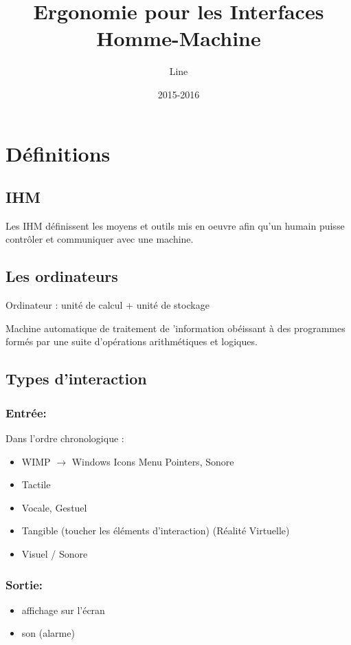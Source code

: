 \documentclass{article}
\title{\textbf{Ergonomie pour les Interfaces Homme-Machine}}
\author{Line \bsc{POUVARET}}
\date{2015-2016}
\begin{document}
\maketitle

\section{Définitions}
\subsection{IHM}
Les IHM définissent les moyens et outils mis en oeuvre afin qu'un humain puisse contrôler et communiquer avec une machine.\\

\subsection{Les ordinateurs}
Ordinateur : unité de calcul + unité de stockage

Machine automatique de traitement de 'information obéissant à des programmes formés par une suite d'opérations arithmétiques et logiques.

\subsection{Types d'interaction}
\subsubsection{Entrée:}
Dans l'ordre chronologique :
\begin{itemize}
	\item WIMP $\rightarrow$ Windows Icons Menu Pointers, Sonore
	\item Tactile
	\item Vocale, Gestuel
	\item Tangible (toucher les éléments d'interaction) (Réalité Virtuelle)
	\item Visuel / Sonore
\end{itemize}
\subsubsection{Sortie:}
\begin{itemize}
	\item affichage sur l'écran
	\item son (alarme)
\end{itemize}
\end{document}
